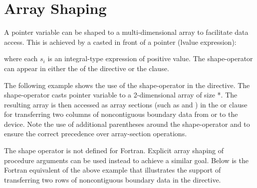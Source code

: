 \section{Array Shaping}
\label{sec:array-shaping}



\ccppspecificstart
A pointer variable can be shaped to a multi-dimensional array to facilitate
data access. This is achieved by a  casted in front of 
a pointer (lvalue expression):
\begin{description}
\item[]\hspace*{5mm}
\end{description}
where each $s_i$ is an integral-type expression of positive value.
The shape-operator can appear in either the 
of the  directive or the  clause.

The following example shows the use of the shape-operator in the 
 directive. The shape-operator \ucode{([nx][ny+2])}
casts pointer variable  to a 2-dimensional array of size
*.  The resulting array is then accessed as
array sections (such as \ucode{[0:nx][1]} and \ucode{[0:nx][ny]}) 
in the  or  clause for transferring two columns of 
noncontiguous boundary data from or to the device.  
Note the use of additional parentheses
around the shape-operator and  to ensure the correct precedence 
over array-section operations.

\ccppspecificend

The shape operator is not defined for Fortran.  Explicit array shaping
of procedure arguments can be used instead to achieve a similar goal.
Below is the Fortran equivalent of the above example that illustrates
the support of transferring two rows of noncontiguous boundary
data in the  directive.
 
